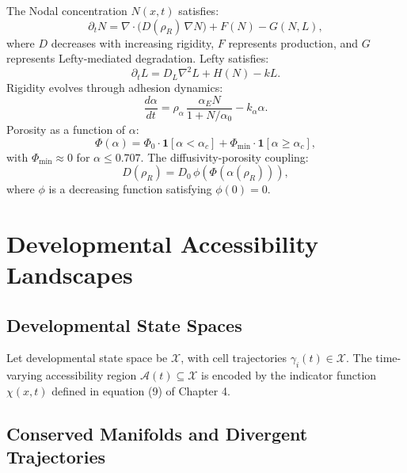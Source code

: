 \documentclass[12pt, a4paper, openany]{book}
\theoremstyle{definition}
\theoremstyle{remark}
\begin{document}
\begin{appendices}
The Nodal concentration $N(x,t)$ satisfies:
\begin{equation}
\partial_t N = \nabla \cdot \big(D(\rho_R)\,\nabla N\big) + F(N) - G(N,L),
\end{equation}
where $D$ decreases with increasing rigidity, $F$ represents production, and $G$ represents Lefty-mediated degradation. Lefty satisfies:
\begin{equation}
\partial_t L = D_L \nabla^2 L + H(N) - kL.
\end{equation}
Rigidity evolves through adhesion dynamics:
\begin{equation}
\frac{d\alpha}{dt} = \rho_{\alpha}\,\frac{\alpha_E N}{1 + N/\alpha_0} - k_\alpha \alpha.
\end{equation}
Porosity as a function of $\alpha$:
\begin{equation}
\Phi(\alpha) = \Phi_0 \cdot \mathbf{1}[\alpha < \alpha_c] + \Phi_{\min}\cdot \mathbf{1}[\alpha \geq \alpha_c],
\end{equation}
with $\Phi_{\min} \approx 0$ for $\alpha \leq 0.707$. The diffusivity-porosity coupling:
\begin{equation}
D({\rho_R}) = D_0\,\phi(\Phi(\alpha(\rho_R))),
\end{equation}
where $\phi$ is a decreasing function satisfying $\phi(0) = 0$.

\chapter{Developmental Accessibility Landscapes}

\section{Developmental State Spaces}

Let developmental state space be $\mathcal{X}$, with cell trajectories $\gamma_i(t) \in \mathcal{X}$. The time-varying accessibility region $\mathcal{A}(t) \subseteq \mathcal{X}$ is encoded by the indicator function $\chi(x,t)$ defined in equation (9) of Chapter 4.

\section{Conserved Manifolds and Divergent Trajectories}


\end{appendices}
\end{document}
